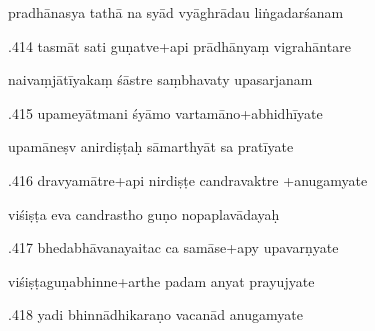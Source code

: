 \documentclass[article,12pt,a4paper]{memoir}%
\newcounter{parCount}
\begin{document}
	  
	  \pstart \leavevmode%
	pradhānasya tathā na syād vyāghrādau liṅgadarśanam 
	{}
	\pend%
      

	  
	  \pstart {}.414 tasmāt sati guṇatve+api prādhānyaṃ vigrahāntare 
	{}
	\pend%
      

	  
	  \pstart \leavevmode%
	naivaṃjātīyakaṃ śāstre saṃbhavaty upasarjanam 
	{}
	\pend%
      

	  
	  \pstart {}.415 upameyātmani śyāmo vartamāno+abhidhīyate 
	{}
	\pend%
      

	  
	  \pstart \leavevmode%
	upamāneṣv anirdiṣṭaḥ sāmarthyāt sa pratīyate 
	{}
	\pend%
      

	  
	  \pstart {}.416 dravyamātre+api nirdiṣṭe candravaktre +anugamyate 
	{}
	\pend%
      

	  
	  \pstart \leavevmode%
	viśiṣṭa eva candrastho guṇo nopaplavādayaḥ 
	{}
	\pend%
      

	  
	  \pstart {}.417 bhedabhāvanayaitac ca samāse+apy upavarṇyate 
	{}
	\pend%
      

	  
	  \pstart \leavevmode%
	viśiṣṭaguṇabhinne+arthe padam anyat prayujyate 
	{}
	\pend%
      

	  
	  \pstart {}.418 yadi bhinnādhikaraṇo vacanād anugamyate 
	{}
	\pend%
      
\end{document}
